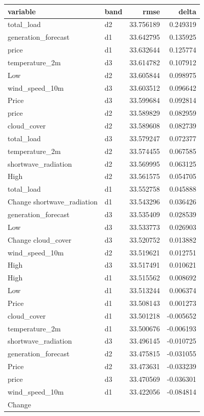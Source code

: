 \begin{tabular}{llrr}
\toprule
variable & band & rmse & delta \\
\midrule
total_load & d2 & 33.756189 & 0.249319 \\
generation_forecast & d1 & 33.642795 & 0.135925 \\
price & d1 & 33.632644 & 0.125774 \\
temperature_2m & d3 & 33.614782 & 0.107912 \\
Low & d2 & 33.605844 & 0.098975 \\
wind_speed_10m & d3 & 33.603512 & 0.096642 \\
Price & d3 & 33.599684 & 0.092814 \\
price & d2 & 33.589829 & 0.082959 \\
cloud_cover & d2 & 33.589608 & 0.082739 \\
total_load & d3 & 33.579247 & 0.072377 \\
temperature_2m & d2 & 33.574455 & 0.067585 \\
shortwave_radiation & d2 & 33.569995 & 0.063125 \\
High & d2 & 33.561575 & 0.054705 \\
total_load & d1 & 33.552758 & 0.045888 \\
Change %
shortwave_radiation & d1 & 33.543296 & 0.036426 \\
generation_forecast & d3 & 33.535409 & 0.028539 \\
Low & d3 & 33.533773 & 0.026903 \\
Change %
cloud_cover & d3 & 33.520752 & 0.013882 \\
wind_speed_10m & d2 & 33.519621 & 0.012751 \\
High & d3 & 33.517491 & 0.010621 \\
High & d1 & 33.515562 & 0.008692 \\
Low & d1 & 33.513244 & 0.006374 \\
Price & d1 & 33.508143 & 0.001273 \\
cloud_cover & d1 & 33.501218 & -0.005652 \\
temperature_2m & d1 & 33.500676 & -0.006193 \\
shortwave_radiation & d3 & 33.496145 & -0.010725 \\
generation_forecast & d2 & 33.475815 & -0.031055 \\
Price & d2 & 33.473631 & -0.033239 \\
price & d3 & 33.470569 & -0.036301 \\
wind_speed_10m & d1 & 33.422056 & -0.084814 \\
Change %
\bottomrule
\end{tabular}
